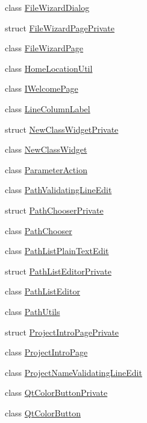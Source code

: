 \begin{DoxyCompactItemize}
\item 
class \hyperlink{class_utils_1_1_file_wizard_dialog}{File\-Wizard\-Dialog}
\item 
struct \hyperlink{struct_utils_1_1_file_wizard_page_private}{File\-Wizard\-Page\-Private}
\item 
class \hyperlink{class_utils_1_1_file_wizard_page}{File\-Wizard\-Page}
\item 
class \hyperlink{class_utils_1_1_home_location_util}{Home\-Location\-Util}
\item 
class \hyperlink{class_utils_1_1_i_welcome_page}{I\-Welcome\-Page}
\item 
class \hyperlink{class_utils_1_1_line_column_label}{Line\-Column\-Label}
\item 
struct \hyperlink{struct_utils_1_1_new_class_widget_private}{New\-Class\-Widget\-Private}
\item 
class \hyperlink{class_utils_1_1_new_class_widget}{New\-Class\-Widget}
\item 
class \hyperlink{class_utils_1_1_parameter_action}{Parameter\-Action}
\item 
class \hyperlink{class_utils_1_1_path_validating_line_edit}{Path\-Validating\-Line\-Edit}
\item 
struct \hyperlink{struct_utils_1_1_path_chooser_private}{Path\-Chooser\-Private}
\item 
class \hyperlink{class_utils_1_1_path_chooser}{Path\-Chooser}
\item 
class \hyperlink{class_utils_1_1_path_list_plain_text_edit}{Path\-List\-Plain\-Text\-Edit}
\item 
struct \hyperlink{struct_utils_1_1_path_list_editor_private}{Path\-List\-Editor\-Private}
\item 
class \hyperlink{class_utils_1_1_path_list_editor}{Path\-List\-Editor}
\item 
class \hyperlink{class_utils_1_1_path_utils}{Path\-Utils}
\item 
struct \hyperlink{struct_utils_1_1_project_intro_page_private}{Project\-Intro\-Page\-Private}
\item 
class \hyperlink{class_utils_1_1_project_intro_page}{Project\-Intro\-Page}
\item 
class \hyperlink{class_utils_1_1_project_name_validating_line_edit}{Project\-Name\-Validating\-Line\-Edit}
\item 
class \hyperlink{class_utils_1_1_qt_color_button_private}{Qt\-Color\-Button\-Private}
\item 
class \hyperlink{class_utils_1_1_qt_color_button}{Qt\-Color\-Button}

\end{DoxyCompactItemize}
